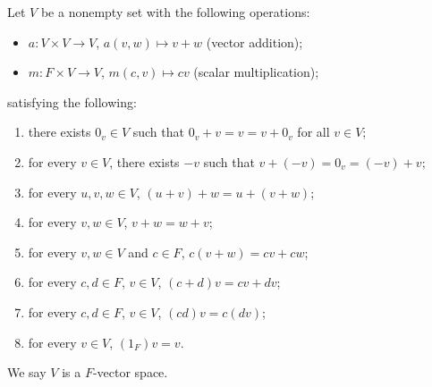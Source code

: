 \documentclass[10pt]{mypackage}
\begin{document}
\begin{definition}
  Let $V$ be a nonempty set with the following operations:
  \begin{itemize}
    \item $a: V\times V \rightarrow V$, $a(v,w)\mapsto v+w$ (vector addition);
    \item $m: F\times V \rightarrow V$, $m(c,v) \mapsto cv$ (scalar multiplication);
  \end{itemize}
  satisfying the following:
  \begin{enumerate}[(1)]
    \item there exists $0_v\in V$ such that $0_v + v = v = v + 0_v$ for all $v\in V$;
    \item for every $v\in V$, there exists $-v$ such that $v + (-v) = 0_v = (-v) + v$;
    \item for every $u,v,w\in V$, $(u+v) + w = u + (v+w)$;
    \item for every $v,w\in V$, $v+w = w+v$;
    \item for every $v,w\in V$ and $c\in F$, $c(v+w) = cv + cw$;
    \item for every $c,d\in F$, $v\in V$, $(c+d)v = cv + dv$;
    \item for every $c,d\in F$, $v\in V$, $(cd)v = c(dv)$;
    \item for every $v\in V$, $\left(1_{F}\right)v = v$.
  \end{enumerate}
  We say $V$ is a $F$-vector space.
\end{definition}
\end{document}
